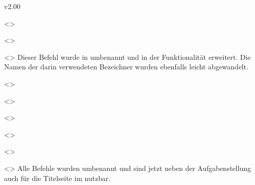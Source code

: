 \begin{Entity}{}
\begin{NoIndexDefault}
\begin{Cessations}{v2.00}
\begin{Entity}{}
\begin{Cessation}
  {}
  <>
\begin{Cessation}
  {}
  <>
\begin{Cessation}
  {}
  <>
\printdeclarationlist
%
Dieser Befehl wurde in  umbenannt und in der Funktionalität 
erweitert. Die Namen der darin verwendeten Bezeichner wurden ebenfalls leicht 
abgewandelt.
\end{Cessation}
\end{Cessation}
\end{Cessation}

\begin{Cessation}
  {}
  <>
\begin{Cessation}
  {}
  <>
\begin{Cessation}
  {}
  <>
\begin{Cessation}
  {}
  <>
\begin{Cessation}
  {}
  <>
\begin{Cessation}
  {}
  <>
\printdeclarationlist
%
Alle Befehle wurden umbenannt und sind jetzt neben der Aufgabenstellung auch 
für die Titelseite im \CD nutzbar.
\end{Cessation}
\end{Cessation}
\end{Cessation}
\end{Cessation}
\end{Cessation}
\end{Cessation}


\end{Entity}
\end{Cessations}
\end{NoIndexDefault}
\end{Entity}
